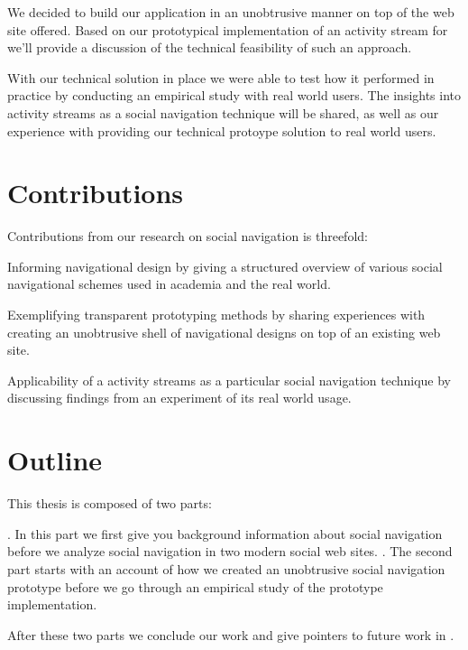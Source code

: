 We decided to build our application in an unobtrusive manner on top of the
web site \urort{} offered.%
Based on our prototypical implementation of an activity stream for \urort{}
we'll provide a discussion of the technical feasibility of such an approach.

With our technical solution in place we were able to test how it performed in
practice by conducting an empirical study with real world users. The insights
into activity streams as a social navigation technique will be shared, as well
as our experience with providing our technical protoype solution to real world
users.

\section{Contributions}

Contributions from our research on social navigation is threefold:

\begin{enum}
  \item Informing navigational design by giving a structured overview of
    various social navigational schemes used in academia and the real world.
  \item Exemplifying transparent prototyping methods by sharing experiences
    with creating an unobtrusive shell of navigational designs on top of an
    existing web site.
  \item Applicability of a activity streams as a particular social navigation
    technique by discussing findings from an experiment of its real world
    usage.
\end{enum}

\section{Outline}

This thesis is composed of two parts:

\begin{enum}
  . In this part we first give you
    background information about social navigation before
    we analyze social navigation in two modern social web sites.
  . The second part starts
    with an account of how we created an unobtrusive social navigation
    prototype before we go through an empirical study of the prototype
    implementation.
\end{enum}

After these two parts we conclude our work and give pointers to future work
in .
